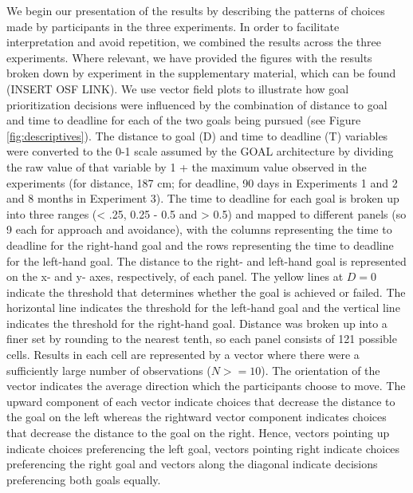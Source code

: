 \documentclass[a4paper,doc,natbib,donotrepeattitle]{apa6}
\begin{document}
We begin our presentation of the results by describing the patterns of choices made by participants in the three experiments. In order to facilitate interpretation and avoid repetition, we combined the results across the three experiments. Where relevant, we have provided the figures with the results broken down by experiment in the supplementary material, which can be found (INSERT OSF LINK). We use vector field plots to illustrate how goal prioritization decisions were influenced by the combination of distance to goal and time to deadline for each of the two goals being pursued (see Figure \ref{fig:descriptives}). The distance to goal (D) and time to deadline (T) variables were converted to the 0-1 scale assumed by the GOAL architecture by dividing the raw value of that variable by 1 + the maximum value observed in the experiments (for distance, 187 cm; for deadline, 90 days in Experiments 1 and 2 and 8 months in Experiment 3). The time to deadline for each goal is broken up into three ranges (< .25, 0.25 - 0.5 and > 0.5) and mapped to different panels (so 9 each for approach and avoidance), with the columns representing the time to deadline for the right-hand goal and the rows representing the time to deadline for the left-hand goal. The distance to the right- and left-hand goal is represented on the x- and y- axes, respectively, of each panel. The yellow lines at $D = 0$ indicate the threshold that determines whether the goal is achieved or failed. The horizontal line indicates the threshold for the left-hand goal and the vertical line indicates the threshold for the right-hand goal. Distance was broken up into a finer set by rounding to the nearest tenth, so each panel consists of 121 possible cells. Results in each cell are represented by a vector where there were a sufficiently large number of observations ($N >= 10$). The orientation of the vector indicates the average direction which the participants choose to move. The upward component of each vector indicate choices that decrease the distance to the goal on the left whereas the rightward vector component indicates choices that decrease the distance to the goal on the right. Hence, vectors pointing up indicate choices preferencing the left goal, vectors pointing right indicate choices preferencing the right goal and vectors along the diagonal indicate decisions preferencing both goals equally.

\end{document}
